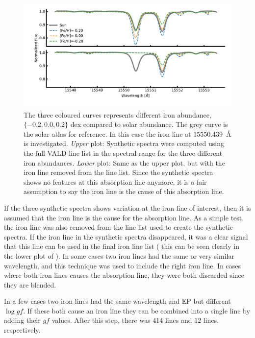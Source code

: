 \begin{figure}[htpb!]
    \centering
    \includegraphics[width=1.0\linewidth]{figures/synthetic_investigation.pdf}
    \caption{The three coloured curves represents different iron abundance, $\{-0.2, 0.0, 0.2\}$ dex
             compared to solar abundance. The grey curve is the solar atlas for reference. In this
             case the iron line at \SI{15550.439}{\angstrom} is investigated. \emph{Upper} plot:
             Synthetic spectra were computed using the full VALD line list in the spectral range for
             the three different iron abundances. \emph{Lower} plot: Same as the upper plot, but
             with the iron line removed from the line list. Since the synthetic spectra shows no
             features at this absorption line anymore, it is a fair assumption to say the iron line
             is the cause of this absorption line.}
    \label{fig:synthetic_investigation}
\end{figure}

If the three synthetic spectra shows variation at the iron line of interest, then it is assumed that
the iron line is the cause for the absorption line. As a simple test, the iron line was also removed
from the line list used to create the synthetic spectra. If the iron line in the synthetic spectra
disappeared, it was a clear signal that this line can be used in the final iron line list ( this can
be seen clearly in the lower plot of ). In some cases two iron
lines had the same or very similar wavelength, and this technique was used to include the right iron
line. In cases where both iron lines causes the absorption line, they were both discarded since they
are blended.

In a few cases two iron lines had the same wavelength and EP but different $\log \mathit{gf}$. If
these both cause an iron line they can be combined into a single line by adding their $\mathit{gf}$
values. After this step, there was 414  lines and 12  lines, respectively.



